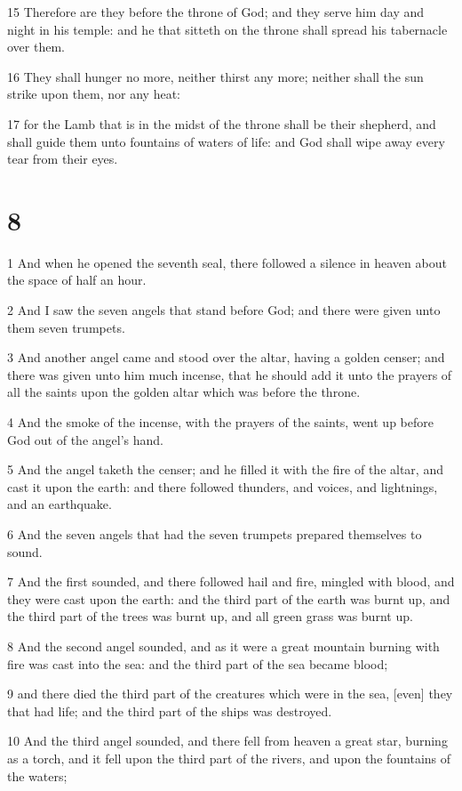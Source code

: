 \par 15 Therefore are they before the throne of God; and they serve him day and night in his temple: and he that sitteth on the throne shall spread his tabernacle over them.
\par 16 They shall hunger no more, neither thirst any more; neither shall the sun strike upon them, nor any heat:
\par 17 for the Lamb that is in the midst of the throne shall be their shepherd, and shall guide them unto fountains of waters of life: and God shall wipe away every tear from their eyes.

\chapter{8}

\par 1 And when he opened the seventh seal, there followed a silence in heaven about the space of half an hour.
\par 2 And I saw the seven angels that stand before God; and there were given unto them seven trumpets.
\par 3 And another angel came and stood over the altar, having a golden censer; and there was given unto him much incense, that he should add it unto the prayers of all the saints upon the golden altar which was before the throne.
\par 4 And the smoke of the incense, with the prayers of the saints, went up before God out of the angel's hand.
\par 5 And the angel taketh the censer; and he filled it with the fire of the altar, and cast it upon the earth: and there followed thunders, and voices, and lightnings, and an earthquake.
\par 6 And the seven angels that had the seven trumpets prepared themselves to sound.
\par 7 And the first sounded, and there followed hail and fire, mingled with blood, and they were cast upon the earth: and the third part of the earth was burnt up, and the third part of the trees was burnt up, and all green grass was burnt up.
\par 8 And the second angel sounded, and as it were a great mountain burning with fire was cast into the sea: and the third part of the sea became blood;
\par 9 and there died the third part of the creatures which were in the sea, [even] they that had life; and the third part of the ships was destroyed.
\par 10 And the third angel sounded, and there fell from heaven a great star, burning as a torch, and it fell upon the third part of the rivers, and upon the fountains of the waters;
